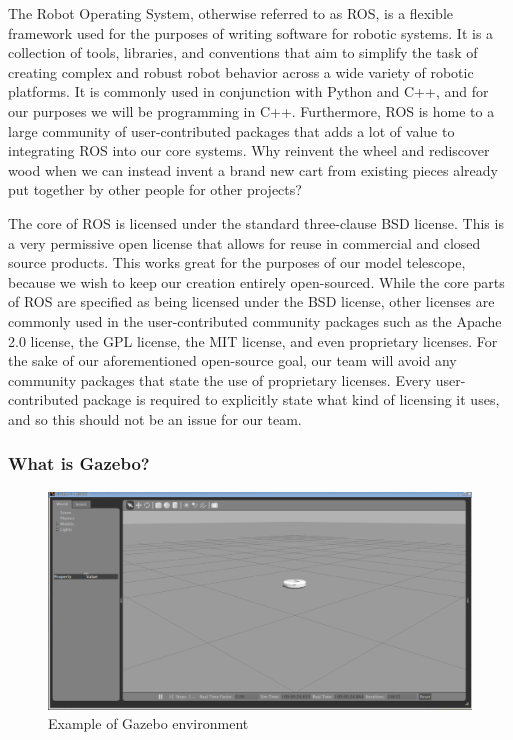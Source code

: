 \documentclass[12pt]{report}
\begin{document}
The Robot Operating System, otherwise referred to as ROS, is a flexible framework used for the purposes of writing software for robotic systems. It is a collection of tools, libraries, and conventions that aim to simplify the task of creating complex and robust robot behavior across a wide variety of robotic platforms.\cite{ROSDescription} It is commonly used in conjunction with Python and C++, and for our purposes we will be programming in C++. Furthermore, ROS is home to a large community of user-contributed packages that adds a lot of value to integrating ROS into our core systems. Why reinvent the wheel and rediscover wood when we can instead invent a brand new cart from existing pieces already put together by other people for other projects?

The core of ROS is licensed under the standard three-clause BSD license. This is a very permissive open license that allows for reuse in commercial and closed source products. This works great for the purposes of our model telescope, because we wish to keep our creation entirely open-sourced. While the core parts of ROS are specified as being licensed under the BSD license, other licenses are commonly used in the user-contributed community packages such as the Apache 2.0 license, the GPL license, the MIT license, and even proprietary licenses. For the sake of our aforementioned open-source goal, our team will avoid any community packages that state the use of proprietary licenses. Every user-contributed package is required to explicitly state what kind of licensing it uses, and so this should not be an issue for our team.

\subsubsection*{What is Gazebo?}

\begin{figure}[h]
	\centering
	\includegraphics[width=0.98\linewidth]{gazebo}
	\caption{Example of Gazebo environment}
\end{figure}
\end{document}
